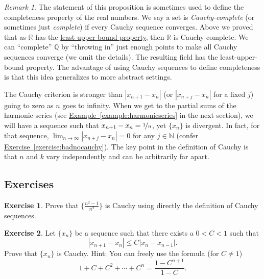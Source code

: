 \documentclass[12pt]{book}
\newcommand{\abs}[1]{\left\lvert {#1} \right\rvert}
\newcommand{\R}{{\mathbb{R}}}
\newcommand{\N}{{\mathbb{N}}}
\newcommand{\Q}{{\mathbb{Q}}}
\newcommand{\myindex}[1]{#1\index{#1}}
\theoremstyle{plain}
\theoremstyle{remark}
\newtheorem{remark}[thm]{Remark}
\theoremstyle{definition}
\theoremstyle{exercise}
\newtheorem{exercise}{Exercise}[section]
\theoremstyle{example}
\newcommand{\exerciseref}[1]{\hyperref[#1]{Exercise~\ref*{#1}}}
\newcommand{\exampleref}[1]{\hyperref[#1]{Example~\ref*{#1}}}
\begin{document}
\begin{remark}
The statement of this proposition is sometimes used to define the
completeness property of the real numbers.  We say a set is
\emph{\myindex{Cauchy-complete}} (or sometimes just \emph{\myindex{complete}})
if every Cauchy sequence converges.
Above we proved that
as $\R$ has the \hyperref[defn:lub]{least-upper-bound property}, then $\R$ is 
Cauchy-complete.
We can ``complete'' $\Q$ by ``throwing in'' just enough points to make all
Cauchy sequences converge (we omit the details).
The resulting field has the
least-upper-bound property.
The advantage of using Cauchy
sequences to define completeness is that this idea generalizes to
more abstract settings.
\end{remark}

The Cauchy criterion is stronger than 
$\abs{x_{n+1}-x_n}$ (or $\abs{x_{n+j}-x_n}$ for a fixed $j$) going to zero as
$n$ goes to
infinity.  When we get to the partial sums of the harmonic series
(see \exampleref{example:harmonicseries} in the next section), we will have
a sequence such that $x_{n+1}-x_n = \nicefrac{1}{n}$, yet $\{ x_n \}$ is
divergent.  In fact, for that sequence,
$\lim_{n\to\infty} \abs{x_{n+j}-x_n} = 0$ for
any $j \in \N$ (confer \exerciseref{exercise:badnocauchy}).
The key point in the definition of Cauchy is that $n$ and $k$
vary independently and can be arbitrarily far apart.


\subsection{Exercises}

\begin{exercise}
Prove that $\{ \frac{n^2-1}{n^2} \}$ is Cauchy using directly the definition
of Cauchy sequences.
\end{exercise}

\begin{exercise}
Let $\{ x_n \}$ be a sequence such that
there exists a $0 < C < 1$ such that
\begin{equation*}
\abs{x_{n+1} - x_n} \leq C \abs{x_{n}-x_{n-1}} .
\end{equation*}
Prove that $\{ x_n \}$ is Cauchy.
Hint:  You can freely use the formula (for $C \not= 1$)
\begin{equation*}
1+ C+ C^2 + \cdots + C^n = \frac{1-C^{n+1}}{1-C}.
\end{equation*}
\end{exercise}
\end{document}
